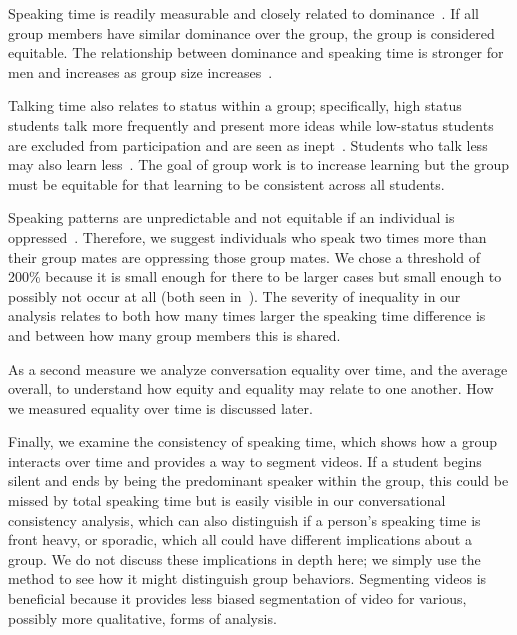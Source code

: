 \documentclass[aps,pra,reprint,noshowpacs,superscriptaddress, nofootinbib]{revtex4-1}
\begin{document}
Speaking time is readily measurable and closely related to dominance~\cite{mast_dominance_2002}. If all group members have similar dominance over the group, the group is considered equitable. The relationship between dominance and speaking time is stronger for men and increases as group size increases~\cite{mast_dominance_2002}. 

Talking time also relates to status within a group; specifically, high status students talk more frequently and present more ideas while low-status students are excluded from participation and are seen as inept~\cite{bianchini_1997}. Students who talk less may also learn less~\cite{cohen_1989}. The goal of group work is to increase learning but the group must be equitable for that learning to be consistent across all students.

Speaking patterns are unpredictable and not equitable if an individual is oppressed~\cite{gutierrez_enabling_2002}. Therefore, we suggest individuals who speak two times more than their group mates are oppressing those group mates. We chose a threshold of 200\% because it is small enough for there to be larger cases but small enough to possibly not occur at all (both seen in~\cite{keil_identifying_2015}). The severity of inequality in our analysis relates to both how many times larger the speaking time difference is and between how many group members this is shared.

As a second measure we analyze conversation equality over time, and the average overall, to understand how equity and equality may relate to one another. How we measured equality over time is discussed later.

Finally, we examine the consistency of speaking time, which shows how a group interacts over time and provides a way to segment videos. If a student begins silent and ends by being the predominant speaker within the group, this could be missed by total speaking time but is easily visible in our conversational consistency analysis, which can also distinguish if a person's speaking time is front heavy, or sporadic, which all could have different implications about a group. We do not discuss these implications in depth here; we simply use the method to see how it might distinguish group behaviors. Segmenting videos is beneficial because it provides less biased segmentation of video for various, possibly more qualitative, forms of analysis. 
%
%
\end{document}

